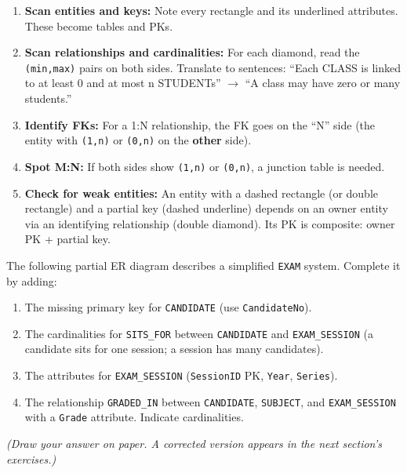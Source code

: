 \documentclass[11pt]{article}
\begin{document}
\begin{methode}
\begin{enumerate}
    \item \textbf{Scan entities and keys:} Note every rectangle and its underlined attributes. These become tables and PKs.
    \item \textbf{Scan relationships and cardinalities:} For each diamond, read the \texttt{(min,max)} pairs on both sides. Translate to sentences: ``Each CLASS is linked to at least 0 and at most n STUDENTs'' $\to$ ``A class may have zero or many students.''
    \item \textbf{Identify FKs:} For a 1:N relationship, the FK goes on the ``N'' side (the entity with \texttt{(1,n)} or \texttt{(0,n)} on the \textbf{other} side).
    \item \textbf{Spot M:N:} If both sides show \texttt{(1,n)} or \texttt{(0,n)}, a junction table is needed.
    \item \textbf{Check for weak entities:} An entity with a dashed rectangle (or double rectangle) and a partial key (dashed underline) depends on an owner entity via an identifying relationship (double diamond). Its PK is composite: owner PK + partial key.
\end{enumerate}
\end{methode}

\begin{exercice}
The following partial ER diagram describes a simplified \texttt{EXAM} system. Complete it by adding:
\begin{enumerate}
    \item The missing primary key for \texttt{CANDIDATE} (use \texttt{CandidateNo}).
    \item The cardinalities for \texttt{SITS\_FOR} between \texttt{CANDIDATE} and \texttt{EXAM\_SESSION} (a candidate sits for one session; a session has many candidates).
    \item The attributes for \texttt{EXAM\_SESSION} (\texttt{SessionID} PK, \texttt{Year}, \texttt{Series}).
    \item The relationship \texttt{GRADED\_IN} between \texttt{CANDIDATE}, \texttt{SUBJECT}, and \texttt{EXAM\_SESSION} with a \texttt{Grade} attribute. Indicate cardinalities.
\end{enumerate}
\textit{(Draw your answer on paper. A corrected version appears in the next section's exercises.)}
\end{exercice}
\end{document}
